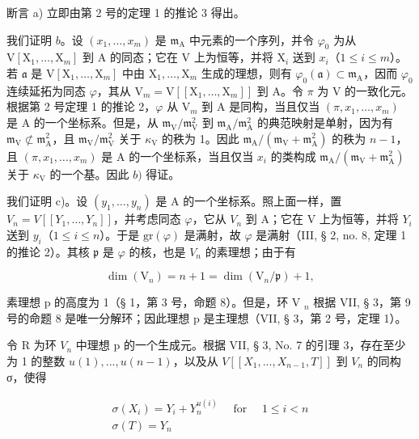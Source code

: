 断言 a) 立即由第 2 号的定理 1 的推论 3 得出。

我们证明 \(b\)。设 \((x_{1},\ldots,x_{m})\) 是 \(\mathfrak{m}_{\mathrm{A}}\) 中元素的一个序列，并令 \(\varphi_{0}\) 为从 \(\mathrm{V}[\mathrm{X}_{1},\ldots,\mathrm{X}_{m}]\) 到 A 的同态；它在 V 上为恒等，并将 \(\mathrm{X}_{i}\) 送到 \(x_{i}\)（\(1\leqslant i\leqslant m\)）。若 \(\mathfrak{a}\) 是 \(\mathrm{V}[\mathrm{X}_{1},\ldots,\mathrm{X}_{m}]\) 中由 \(\mathrm{X}_{1},\ldots,\mathrm{X}_{m}\) 生成的理想，则有 \(\varphi_{0}(\mathfrak{a})\subset\mathfrak{m}_{\mathrm{A}}\)，因而 \(\varphi_{0}\) 连续延拓为同态 \(\varphi\)，其从 \(\mathrm{V}_{m}=\mathrm{V}[[\mathrm{X}_{1},\ldots,\mathrm{X}_{m}]]\) 到 A。令 \(\pi\) 为 V 的一致化元。根据第 2 号定理 1 的推论 2，\(\varphi\) 从 \(\mathrm{V}_{m}\) 到 A 是同构，当且仅当 \((\pi,x_{1},\ldots,x_{m})\) 是 A 的一个坐标系。但是，从 \(\mathfrak{m}_{\mathrm{V}}/\mathfrak{m}_{\mathrm{V}}^{2}\) 到 \(\mathfrak{m}_{\mathrm{A}}/\mathfrak{m}_{\mathrm{A}}^{2}\) 的典范映射是单射，因为有 \(\mathfrak{m}_{\mathrm{V}}\not\subset\mathfrak{m}_{\mathrm{A}}^{2}\)，且 \(\mathfrak{m}_{\mathrm{V}}/\mathfrak{m}_{\mathrm{V}}^{2}\) 关于 \(\kappa_{\mathrm{V}}\) 的秩为 1。因此 \(\mathfrak{m}_{\mathrm{A}}/(\mathfrak{m}_{\mathrm{V}}+\mathfrak{m}_{\mathrm{A}}^{2})\) 的秩为 \(n-1\)，且 \((\pi,x_{1},\ldots,x_{m})\) 是 A 的一个坐标系，当且仅当 \(x_{i}\) 的类构成 \(\mathfrak{m}_{\mathrm{A}}/(\mathfrak{m}_{\mathrm{V}}+\mathfrak{m}_{\mathrm{A}}^{2})\) 关于 \(\kappa_{\mathrm{V}}\) 的一个基。因此 \(b)\) 得证。

我们证明 c)。设 \((y_{1}, \ldots, y_{n})\) 是 A 的一个坐标系。照上面一样，置 \(V_{n} = V[[Y_{1}, \ldots, Y_{n}]]\)，并考虑同态 \(\varphi\)，它从 \(V_{n}\) 到 A；它在 V 上为恒等，并将 \(Y_{i}\) 送到 \(y_{i}\)（\(1 \leqslant i \leqslant n\)）。于是 \(\text{gr}(\varphi)\) 是满射，故 \(\varphi\) 是满射（III, § 2, no. 8, 定理 1 的推论 2）。其核 \(\mathfrak{p}\) 是 \(\varphi\) 的核，也是 \(V_{n}\) 的素理想；由于有

\[
\dim (\mathrm{V} _ {n}) = n + 1 = \dim (\mathrm{V} _ {n} / \mathfrak {p}) + 1,
\]

素理想 p 的高度为 1（§ 1，第 3 号，命题 8）。但是，环 V \(_{n}\) 根据 VII, § 3，第 9 号的命题 8 是唯一分解环；因此理想 p 是主理想（VII, § 3，第 2 号，定理 1）。

令 R 为环 \(V_{n}\) 中理想 p 的一个生成元。根据 VII, § 3, No. 7 的引理 3，存在至少为 1 的整数 \(u(1), ..., u(n - 1)\)，以及从 \(V[[X_{1}, ..., X_{n-1}, T]]\) 到 \(V_{n}\) 的同构 σ，使得

\[
\begin{array}{l} \sigma (X _ {i}) = Y _ {i} + Y _ {n} ^ {u (i)} \quad \text { for } \quad 1 \leqslant i <   n \\ \sigma (T) = Y _ {n} \end{array}
\]

